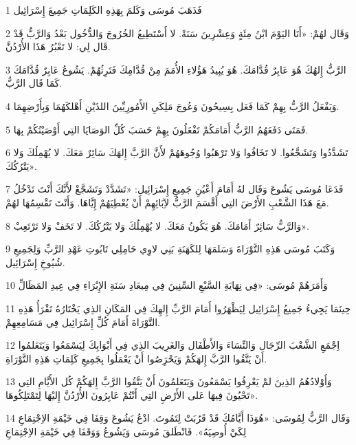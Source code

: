 \par 1 فَذَهَبَ مُوسَى وَكَلمَ بِهَذِهِ الكَلِمَاتِ جَمِيعَ إِسْرَائِيل
\par 2 وَقَال لهُمْ: «أَنَا اليَوْمَ ابْنُ مِئَةٍ وَعِشْرِينَ سَنَةً. لا أَسْتَطِيعُ الخُرُوجَ وَالدُّخُول بَعْدُ وَالرَّبُّ قَدْ قَال لِي: لا تَعْبُرُ هَذَا الأُرْدُنَّ.
\par 3 الرَّبُّ إِلهُكَ هُوَ عَابِرٌ قُدَّامَكَ. هُوَ يُبِيدُ هَؤُلاءِ الأُمَمَ مِنْ قُدَّامِكَ فَتَرِثُهُمْ. يَشُوعُ عَابِرٌ قُدَّامَكَ كَمَا قَال الرَّبُّ.
\par 4 وَيَفْعَلُ الرَّبُّ بِهِمْ كَمَا فَعَل بِسِيحُونَ وَعُوجَ مَلِكَيِ الأَمُورِيِّينَ اللذَيْنِ أَهْلكَهُمَا وَبِأَرْضِهِمَا.
\par 5 فَمَتَى دَفَعَهُمُ الرَّبُّ أَمَامَكُمْ تَفْعَلُونَ بِهِمْ حَسَبَ كُلِّ الوَصَايَا التِي أَوْصَيْتُكُمْ بِهَا.
\par 6 تَشَدَّدُوا وَتَشَجَّعُوا. لا تَخَافُوا وَلا تَرْهَبُوا وُجُوهَهُمْ لأَنَّ الرَّبَّ إِلهَكَ سَائِرٌ مَعَكَ. لا يُهْمِلُكَ وَلا يَتْرُكُكَ».
\par 7 فَدَعَا مُوسَى يَشُوعَ وَقَال لهُ أَمَامَ أَعْيُنِ جَمِيعِ إِسْرَائِيل: «تَشَدَّدْ وَتَشَجَّعْ لأَنَّكَ أَنْتَ تَدْخُلُ مَعَ هَذَا الشَّعْبِ الأَرْضَ التِي أَقْسَمَ الرَّبُّ لآِبَائِهِمْ أَنْ يُعْطِيَهُمْ إِيَّاهَا. وَأَنْتَ تَقْسِمُهَا لهُمْ.
\par 8 وَالرَّبُّ سَائِرٌ أَمَامَكَ. هُوَ يَكُونُ مَعَكَ. لا يُهْمِلُكَ وَلا يَتْرُكُكَ. لا تَخَفْ وَلا تَرْتَعِبْ».
\par 9 وَكَتَبَ مُوسَى هَذِهِ التَّوْرَاةَ وَسَلمَهَا لِلكَهَنَةِ بَنِي لاوِي حَامِلِي تَابُوتِ عَهْدِ الرَّبِّ وَلِجَمِيعِ شُيُوخِ إِسْرَائِيل.
\par 10 وَأَمَرَهُمْ مُوسَى: «فِي نِهَايَةِ السَّبْعِ السِّنِينَ فِي مِيعَادِ سَنَةِ الإِبْرَاءِ فِي عِيدِ المَظَالِّ
\par 11 حِينَمَا يَجِيءُ جَمِيعُ إِسْرَائِيل لِيَظْهَرُوا أَمَامَ الرَّبِّ إِلهِكَ فِي المَكَانِ الذِي يَخْتَارُهُ تَقْرَأُ هَذِهِ التَّوْرَاةَ أَمَامَ كُلِّ إِسْرَائِيل فِي مَسَامِعِهِمْ.
\par 12 اِجْمَعِ الشَّعْبَ الرِّجَال وَالنِّسَاءَ وَالأَطْفَال وَالغَرِيبَ الذِي فِي أَبْوَابِكَ لِيَسْمَعُوا وَيَتَعَلمُوا أَنْ يَتَّقُوا الرَّبَّ إِلهَكُمْ وَيَحْرَِصُوا أَنْ يَعْمَلُوا بِجَمِيعِ كَلِمَاتِ هَذِهِ التَّوْرَاةِ.
\par 13 وَأَوْلادُهُمُ الذِينَ لمْ يَعْرِفُوا يَسْمَعُونَ وَيَتَعَلمُونَ أَنْ يَتَّقُوا الرَّبَّ إِلهَكُمْ كُل الأَيَّامِ التِي تَحْيُونَ فِيهَا عَلى الأَرْضِ التِي أَنْتُمْ عَابِرُونَ الأُرْدُنَّ إِليْهَا لِتَمْتَلِكُوهَا».
\par 14 وَقَال الرَّبُّ لِمُوسَى: «هُوَذَا أَيَّامُكَ قَدْ قَرُبَتْ لِتَمُوتَ. ادْعُ يَشُوعَ وَقِفَا فِي خَيْمَةِ الاِجْتِمَاعِ لِكَيْ أُوصِيَهُ». فَانْطَلقَ مُوسَى وَيَشُوعُ وَوَقَفَا فِي خَيْمَةِ الاِجْتِمَاعِ
